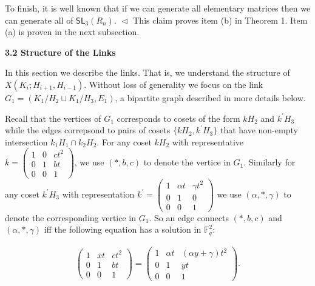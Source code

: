 To finish, it is well known that if we can generate all elementary matrices then we can generate all of $\textsf{SL}_{3}(R_{n})$.
$\vartriangleleft$
This claim proves item (b) in Theorem 1. Item (a) is proven in the next subsection.\par






\par\medskip\noindent\textbf{
3.2 Structure of the Links}\par




In this section we describe the links. That is, we understand the structure of $X(K_{i};H_{i+1},H_{i-1})$. Without loss of generality we focus on the link $G_{1}=(K_{1}/H_{2}\sqcup K_{1}/H_{3},E_{1})$, a bipartite graph described in more details below.\par




Recall that the vertices of $G_{1}$ corresponds to cosets of the form $kH_{2}$ and $k^{\prime}H_{3}$ while the edges correpsond to pairs of cosets $\{kH_{2},k^{\prime}H_{3}\}$ that have non-empty intersection $k_{1}H_{1}\cap k_{2}H_{2}$. For any coset $kH_{2}$ with representative $k=\begin{pmatrix}1&0&ct^{2}\\
0&1&bt\\
0&0&1\end{pmatrix}$, we use $(*,b,c)$ to denote the vertice in $G_{1}$. Similarly for any coset $k^{\prime}H_{3}$ with representation $k^{\prime}=\begin{pmatrix}1&\alpha t&\gamma t^{2}\\
0&1&0\\
0&0&1\end{pmatrix}$ we use $(\alpha,*,\gamma)$ to denote the corresponding vertice in $G_{1}$.
So an edge connects $(*,b,c)$ and $(\alpha,*,\gamma)$ iff the following equation has a solution in $\mathbb{F}^{2}_{q}$:\par


\[\begin{gathered}
\displaystyle\begin{pmatrix}1&xt&ct^{2}\\
0&1&bt\\
0&0&1\end{pmatrix}=\begin{pmatrix}1&\alpha t&(\alpha y+\gamma)t^{2}\\
0&1&yt\\
0&0&1\end{pmatrix}.
\end{gathered}\]


